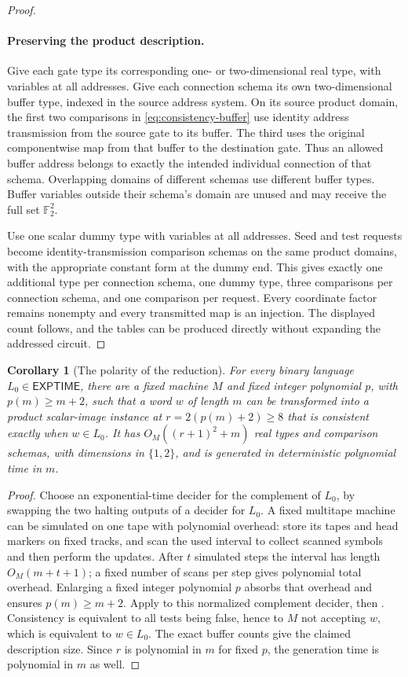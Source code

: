 \documentclass[11pt]{article}
\newtheorem{corollary}[theorem]{Corollary}
\theoremstyle{definition}
\begin{document}
\begin{proof}
\paragraph{Preserving the product description.}
Give each gate type its corresponding one- or two-dimensional real type,
with variables at all addresses. Give each connection schema its own
two-dimensional buffer type, indexed in the source address system. On its
source product domain, the first two comparisons in
\eqref{eq:consistency-buffer} use identity address transmission from the
source gate to its buffer. The third uses the original componentwise map
from that buffer to the destination gate. Thus an allowed buffer address
belongs to exactly the intended individual connection of that schema.
Overlapping domains of different schemas use different buffer types.
Buffer variables outside their schema's domain are unused and may receive
the full set $\mathbb F_2^2$.

Use one scalar dummy type with variables at all addresses. Seed and test
requests become identity-transmission comparison schemas on the same
product domains, with the appropriate constant form at the dummy end.
This gives exactly one additional type per connection schema, one dummy
type, three comparisons per connection schema, and one comparison per
request. Every coordinate factor remains nonempty and every transmitted
map is an injection. The displayed count follows, and the tables can be
produced directly without expanding the addressed circuit.
\end{proof}

\begin{corollary}[The polarity of the reduction]\label{prop:computation-images}
For every binary language \(L_0\in\mathsf{EXPTIME}\), there are a fixed machine
\(M\) and fixed integer polynomial \(p\), with \(p(m)\ge m+2\), such that
a word \(w\) of length \(m\) can be transformed into a product
scalar-image instance at \(r=2(p(m)+2)\ge8\) that is consistent exactly
when \(w\in L_0\). It has \(O_M((r+1)^2+m)\) real types and
comparison schemas, with dimensions in \(\{1,2\}\), and is generated
in deterministic polynomial time in \(m\).
\end{corollary}
\begin{proof}
Choose an exponential-time decider for the complement of \(L_0\),
by swapping the two halting outputs of a decider for \(L_0\).
A fixed multitape machine can be simulated on one tape with polynomial
overhead: store its tapes and head markers on fixed tracks, and scan the
used interval to collect scanned symbols and then perform the updates.
After \(t\) simulated steps the interval has length \(O_M(m+t+1)\);
a fixed number of scans per step gives polynomial total overhead.
Enlarging a fixed integer polynomial \(p\) absorbs that overhead and
ensures \(p(m)\ge m+2\). Apply  to this normalized
complement decider, then . Consistency is equivalent
to all tests being false, hence to \(M\) not accepting \(w\), which is
equivalent to \(w\in L_0\). The exact buffer counts give the claimed
description size. Since \(r\) is polynomial in \(m\) for fixed \(p\),
the generation time is polynomial in \(m\) as well.
\end{proof}
\end{document}
